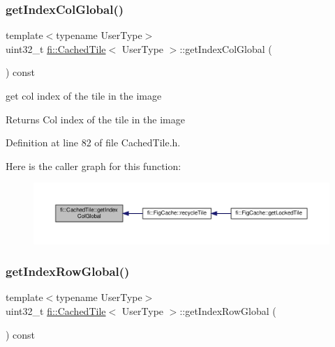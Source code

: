 \subsubsection{\texorpdfstring{get\+Index\+Col\+Global()}{getIndexColGlobal()}}
{\footnotesize\ttfamily template$<$typename User\+Type$>$ \\
uint32\+\_\+t \hyperlink{classfi_1_1CachedTile}{fi\+::\+Cached\+Tile}$<$ User\+Type $>$\+::get\+Index\+Col\+Global (\begin{DoxyParamCaption}{ }\end{DoxyParamCaption}) const\hspace{0.3cm}{\ttfamily [inline]}}



get col index of the tile in the image 

\begin{DoxyReturn}{Returns}
Col index of the tile in the image 
\end{DoxyReturn}


Definition at line 82 of file Cached\+Tile.\+h.

Here is the caller graph for this function\+:
\nopagebreak
\begin{figure}[H]
\begin{center}
\leavevmode
\includegraphics[width=350pt]{d0/dbc/classfi_1_1CachedTile_a6e351e6dbc3856d4e3a944eabb615ff9_icgraph}
\end{center}
\end{figure}
\mbox{\label{classfi_1_1CachedTile_a970c5b3cb066030fee17e9c60b9814ab}} 
\subsubsection{\texorpdfstring{get\+Index\+Row\+Global()}{getIndexRowGlobal()}}
{\footnotesize\ttfamily template$<$typename User\+Type$>$ \\
uint32\+\_\+t \hyperlink{classfi_1_1CachedTile}{fi\+::\+Cached\+Tile}$<$ User\+Type $>$\+::get\+Index\+Row\+Global (\begin{DoxyParamCaption}{ }\end{DoxyParamCaption}) const\hspace{0.3cm}{\ttfamily [inline]}}



